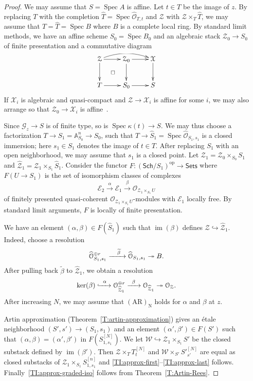 \documentclass[a4paper]{amsart}
\theoremstyle{plain}
\theoremstyle{definition}
\theoremstyle{remark}
\numberwithin{equation}{section}
\newcommand{\inj}{\hookrightarrow} %
\newcommand{\surj}{\twoheadrightarrow} %
\newcommand{\stX}{\mathcal{X}} %
\newcommand{\stZ}{\mathcal{Z}} %
\newcommand{\stW}{\mathcal{W}} %
\newcommand{\stG}{\mathcal{G}} %
\newcommand{\sE}{\mathcal{E}} %
\newcommand{\AR}[1]{\mathrm{(AR)_{#1}}} %
\newcommand{\op}{\mathrm{op}} %
\renewcommand\AA{\mathbb{A}}
\newcommand\cE{\mathcal{E}}
\newcommand\cZ{\mathcal{Z}}
\newcommand\oh{\mathcal{O}}
\DeclareMathOperator{\Spec}{Spec}
\newcommand\Sets{\mathsf{Sets}}
\renewcommand{\tilde}{\widetilde}
\renewcommand{\hat}{\widehat}
\newcommand{\itemref}[1]{\eqref{#1}}
\newcommand{\Sch}{\mathsf{Sch}}
\DeclareMathOperator{\im}{im}
\begin{document}
\begin{proof}
We may assume that $S=\Spec A$ is affine. Let $t\in T$ be the image of $z$. By replacing $T$ with the completion $\hat{T}=\Spec \hat{\oh}_{T,t}$
and $\cZ$ with $\cZ \times_T \hat{T}$, we may assume that $T=\hat{T}=\Spec
B$ where $B$ is a complete local ring. By standard limit methods, we have an
affine scheme $S_0=\Spec B_0$ and an algebraic stack $\cZ_0\to S_0$ of finite
presentation and a commutative diagram
\[
\xymatrix{%
\cZ\ar[r]\ar[d]\ar@/^2ex/[rr] & \cZ_0\ar[r]\ar[d] & \stX\ar[d] \\
T\ar[r] & S_0\ar[r]\ar@{}[ul]|\square & S
}%
\]
If $\stX_i$ is algebraic and quasi-compact and $\cZ\to \stX_i$ is
affine for some $i$, we may also arrange so that $\cZ_0\to \stX_i$ is
affine~\cite[Thm.~C]{rydh-noetherian}.

Since $\stG_z\to S$ is of finite type, so is $\Spec \kappa(t)\to S$. We may
thus choose a factorization $T\to S_1=\AA^n_{S_0}\to S_0$, such that
$T\to \hat{S}_1=\Spec \hat{\oh}_{S_1,s_1}$ is a
closed immersion; here $s_1\in S_1$ denotes the image of $t\in T$.
After replacing $S_1$ with an open neighborhood, we may assume that $s_1$ is a
closed point. Let
$\stZ_1=\stZ_0\times_{S_0} S_1$ and
$\hat{\stZ}_1=\stZ_1\times_{S_1}\hat{S}_1$. Consider the functor
$F\colon (\Sch/S_1)^\op\to \Sets$ where $F(U \to S_1)$ is the set of isomorphism
classes of complexes 
$$ \sE_2\xrightarrow{\alpha} \sE_1\xrightarrow{\beta}
  \oh_{\stZ_1 \times_{S_1}U}$$ 
  of finitely presented quasi-coherent $\oh_{\stZ_1 \times_{S_1} U} $-modules with $\cE_1$ locally free. By standard limit arguments, $F$ is locally of finite presentation.

We have an element $(\alpha,\beta)\in F(\hat{S}_1)$ such that $\im(\beta)$
defines $\stZ \inj \hat{\stZ}_1$. Indeed, choose a resolution
\[
\hat{\oh}_{S_1,s_1}^{\mathrlap{\oplus r}}\xrightarrow{\quad\tilde{\beta}\;\;}\hat{\oh}_{S_1,s_1}\surj B.
\]
After pulling back $\tilde{\beta}$ to $\hat{\stZ}_1$, we obtain a resolution
\[
\ker(\beta)\xhookrightarrow{\;\;\alpha\;\;} \oh_{\hat{\stZ}_1}^{\oplus r}
  \xrightarrow{\;\;\beta\;\;} \oh_{\hat{\stZ}_1}\surj \oh_{\stZ}.
\]
After increasing $N$, we may assume that $\AR{N}$ holds for $\alpha$
and $\beta$ at $z$.

Artin approximation (Theorem~\ref{T:artin-approximation}) gives
an \'etale neighborhood $(S',s') \to (S_1,s_1)$ and an
element $(\alpha',\beta')\in F(S')$ such that $(\alpha,\beta)=
(\alpha',\beta')$ in $F(S_{1,s_1}^{[N]})$. We let $\stW\inj \stZ_1\times_{S_1}
S'$ be the closed substack defined by $\im(\beta')$.  Then $\stZ \times_T T_t^{[N]}$ and
$\stW \times_{S'} S'^{[N]}_{s'}$ are equal as closed substacks of $\stZ_1\times_{S_1} S_{1,s_1}^{[n]}$ and \itemref{TI:approx-first}--\itemref{TI:approx-last}
follows. Finally~\itemref{TI:approx-graded-iso} follows from Theorem~\ref{T:Artin-Rees}.
\end{proof}
\end{document}
